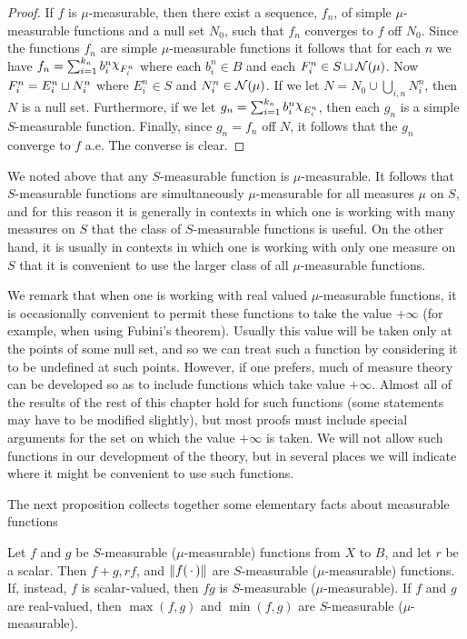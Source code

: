 \begin{proof}
If $f$ is $\mu$-measurable, then there exist a sequence, $f_n$, of simple $\mu$-measurable functions and a null set $N_0$, such that $f_n$ converges to $f$ off $N_0$. Since the functions $f_n$ are simple $\mu$-measurable functions it follows that for each $n$ we have $f_n=\sum_{i=1}^{k_n}b_i^n\idf{F_i^n}$ where each $b_i^n \in B$ and each $F_i^n \in S\sqcup{\cal N}(\mu)$. Now $F_i^n=E_i^n \sqcup N_i^n$ where $E_i^n \in S$ and $N_i^n \in {\cal N}(\mu)$. If we let $N=N_0 \cup \bigcup_{i, n} N_i^n$, then $N$ is a null set. Furthermore, if we let $g_n=\sum_{i=1}^{k_n} b_i^n \idf{E_i^n}$, then each $g_n$ is a simple $S$-measurable function. Finally, since $g_n=f_n$ off $N$, it follows that the $g_n$ converge to $f$ a.e. The converse is clear.
\end{proof}

We noted above that any $S$-measurable function is $\mu$-measurable. It follows that $S$-measurable functions are simultaneously $\mu$-measurable for all measures $\mu$ on $S$, and for this reason it is generally in contexts in which one is working with many measures on $S$ that the class of $S$-measurable functions is useful. On the other hand, it is usually in contexts in which one is working with only one measure on $S$ that it is convenient to use the larger class of all $\mu$-measurable functions.

We remark that when one is working with real valued $\mu$-measurable functions, it is occasionally convenient to permit these functions to take the value $+\infty$ (for example, when using Fubini's theorem). Usually this value will be taken only at the points of some null set, and so we can treat such a function by considering it to be undefined at such points. However, if one prefers, much of measure theory can be developed so as to include functions which take value $+\infty$. Almost all of the results of the rest of this chapter hold for such functions (some statements may have to be modified slightly), but most proofs must include special arguments for the set on which the value $+\infty$ is taken. We will not allow such functions in our development of the theory, but in several places we will indicate where it might be convenient to use such functions.

The next proposition collects together some elementary facts about measurable functions

\begin{proposition}
\label{prop:sum product of meas function}
Let $f$ and $g$ be $S$-measurable ($\mu$-measurable) functions from $X$ to $B$, and let $r$ be a scalar. Then $f+g, rf$, and $\norm{f(\,\cdot\,)}$ are $S$-measurable ($\mu$-measurable) functions. If, instead, $f$ is scalar-valued, then $fg$ is $S$-measurable ($\mu$-measurable). If $f$ and $g$ are real-valued, then $\max(f, g)$ and $\min(f, g)$ are $S$-measurable ($\mu$-measurable).
\end{proposition}

